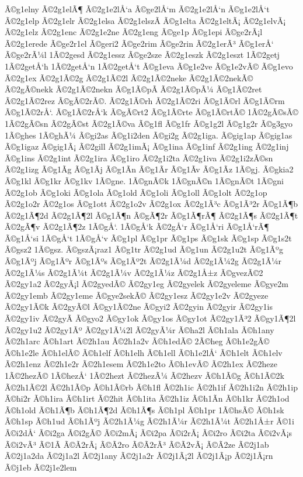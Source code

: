 {Ã©g1elny
Ã©2g1elÃ¶
Ã©2g1e2lÅ‘a
Ã©ge2lÅ‘m
Ã©2g1e2lÅ‘n
Ã©g1e2lÅ‘t
Ã©2g1elp
Ã©2g1elr
Ã©2g1elsa
Ã©2g1elszÃ­
Ã©g1elta
Ã©2g1eltÃ¡
Ã©2g1elvÃ¡
Ã©2g1elz
Ã©2g1enc
Ã©2g1e2ne
Ã©2g1eng
Ã©ge1p
Ã©g1epi
Ã©ge2rÃ¡l
Ã©2g1erede
Ã©ge2r1el
Ã©geri2
Ã©ge2rim
Ã©ge2rin
Ã©2g1erÃ³
Ã©g1erÅ‘
Ã©ge2rÃ¼l
1Ã©2gesd
Ã©2g1essz
Ã©ge2sze
Ã©2g1eszk
Ã©2g1eszt
1Ã©2getj
1Ã©2getÅ‘h
1Ã©2getÅ‘n
1Ã©2getÅ‘t
Ã©g1eva
Ã©g1e2ve
Ã©g1e2vÃ©
Ã©g1evo
Ã©2g1ex
Ã©2g1Ã©2g
Ã©2g1Ã©2l
Ã©2g1Ã©2neke
Ã©2g1Ã©2nekÃ©
Ã©2gÃ©nekk
Ã©2g1Ã©2nekn
Ã©g1Ã©pÃ­
Ã©2g1Ã©pÃ¼
Ã©g1Ã©2ret
Ã©2g1Ã©2rez
Ã©gÃ©2rÃ©.
Ã©2g1Ã©rh
Ã©2g1Ã©2ri
Ã©g1Ã©rl
Ã©g1Ã©rm
Ã©g1Ã©2rÅ‘.
Ã©g1Ã©2rÅ‘k
Ã©gÃ©rt2
Ã©g1Ã©rte
Ã©g1Ã©rtÃ©
1Ã©2gÃ©sÃ©
1Ã©2gÃ©sn
Ã©2gÃ©st
Ã©2g1Ã©va
Ã©g1fl
Ã©g1fr
Ã©g1g2l
Ã©g1g2r
Ã©g3gyo
1Ã©ghes
1Ã©ghÃ¼
Ã©gi2as
Ã©g1i2den
Ã©gi2g
Ã©2g1iga.
Ã©gig1ap
Ã©gig1as
Ã©g1igaz
Ã©gig1Ã¡
Ã©2gill
Ã©2g1imÃ¡
Ã©g1ina
Ã©g1inf
Ã©2g1ing
Ã©2g1inj
Ã©g1ins
Ã©2g1int
Ã©2g1ira
Ã©g1iro
Ã©2g1i2ta
Ã©2g1iva
Ã©2g1i2zÃ©sn
Ã©2g1izg
Ã©g1Ã­g
Ã©g1Ã­j
Ã©g1Ã­n
Ã©g1Ã­r
Ã©g1Ã­v
Ã©g1Ã­z
1Ã©gj.
Ã©gkia2
Ã©g1kl
Ã©g1kr
Ã©g1kv
1Ã©gne.
1Ã©gnÃ©k
1Ã©gnÃ©n
1Ã©gnÃ©t
1Ã©gni
Ã©2g1ob
Ã©g1oki
Ã©g1ola
Ã©g1old
Ã©g1oli
Ã©g1oll
Ã©g1olt
Ã©2g1op
Ã©2g1o2r
Ã©2g1os
Ã©g1ott
Ã©2g1o2v
Ã©2g1ox
Ã©2g1Ã³c
Ã©g1Ã³2r
Ã©g1Ã¶b
Ã©2g1Ã¶2d
Ã©2g1Ã¶2l
Ã©g1Ã¶n
Ã©gÃ¶2r
Ã©g1Ã¶rÃ¶
Ã©2g1Ã¶s
Ã©2g1Ã¶t
Ã©2gÃ¶v
Ã©2g1Ã¶2z
1Ã©gÅ‘.
1Ã©gÅ‘k
Ã©2gÅ‘r
Ã©g1Å‘ri
Ã©g1Å‘rÃ¶
Ã©g1Å‘si
1Ã©gÅ‘t
1Ã©gÅ‘v
Ã©g1pl
Ã©g1pr
Ã©g1ps
Ã©g1sk
Ã©g1sp
Ã©g1s2t
Ã©gsz2
1Ã©gsz.
Ã©gszÃ¡raz1
Ã©g1tr
Ã©2g1ud
Ã©g1un
Ã©2g1u2t
Ã©g1Ãºg
Ã©g1Ãºj
Ã©g1Ãºr
Ã©g1Ãºs
Ã©g1Ãº2t
Ã©2g1Ã¼d
Ã©2g1Ã¼2g
Ã©2g1Ã¼r
Ã©2g1Ã¼s
Ã©2g1Ã¼t
Ã©2g1Ã¼v
Ã©2g1Ã¼z
Ã©2g1Å±z
Ã©gvezÃ©2
Ã©2gy1a2
Ã©2gyÃ¡l
Ã©2gyedÃ©
Ã©2gy1eg
Ã©2gyelek
Ã©2gyeleme
Ã©gye2m
Ã©2gy1emb
Ã©2gy1eme
Ã©gye2sekÃ©
Ã©2gy1esz
Ã©2gy1e2v
Ã©2gyeze
Ã©2gy1Ã©k
Ã©2gyÃ©l
Ã©gy1Ã©2ne
Ã©gyi2
Ã©2gyin
Ã©2gyir
Ã©2gy1is
Ã©2gy1iv
Ã©2gyÃ­
Ã©gyo2
Ã©gy1ok
Ã©gy1os
Ã©gy1ot
Ã©2gy1Ã³2
Ã©gy1Ã¶2l
Ã©2gy1u2
Ã©2gy1Ãº
Ã©2gy1Ã¼2l
Ã©2gyÃ¼r
Ã©ha2l
Ã©h1ala
Ã©h1any
Ã©2h1arc
Ã©h1art
Ã©2h1au
Ã©2h1a2v
Ã©h1edÃ©
2Ã©heg
Ã©h1e2gÃ©
Ã©h1e2le
Ã©h1elÃ©
Ã©h1elf
Ã©h1elh
Ã©h1ell
Ã©h1e2lÅ‘
Ã©h1elt
Ã©h1elv
Ã©2h1enz
Ã©2h1e2r
Ã©2h1esem
Ã©2h1e2to
Ã©h1evÃ©
Ã©2h1ex
Ã©2heze
1Ã©2hezÃ©
1Ã©hezÅ‘
1Ã©2hezt
Ã©2hezÃ¼
Ã©2hezv
Ã©h1Ã©g
Ã©h1Ã©2k
Ã©2h1Ã©2l
Ã©2h1Ã©p
Ã©h1Ã©rb
Ã©h1fl
Ã©2h1ic
Ã©2h1if
Ã©2h1i2n
Ã©2h1ip
Ã©hi2r
Ã©h1ira
Ã©h1irt
Ã©2hit
Ã©h1ita
Ã©2h1iz
Ã©h1Ã­n
Ã©h1kr
Ã©2h1od
Ã©h1old
Ã©h1Ã¶b
Ã©h1Ã¶2d
Ã©h1Ã¶s
Ã©h1pl
Ã©h1pr
1Ã©hsÃ©
Ã©h1sk
Ã©h1sp
Ã©h1ud
Ã©h1Ãºj
Ã©2h1Ã¼g
Ã©2h1Ã¼r
Ã©2h1Ã¼t
Ã©2h1Å±r
Ã©1i
Ã©i2dÅ‘
Ã©i2ga
Ã©i2gÃ©
Ã©i2mÃ¡
Ã©i2pa
Ã©i2rÃ¡
Ã©i2ro
Ã©i2ta
Ã©i2vÃ¡s
Ã©i2vÃ³
Ã©1Ã­
Ã©Ã­2rÃ¡
Ã©Ã­2ro
Ã©Ã­2rÃ³
Ã©Ã­2vÃ¡
Ã©Ã­2ze
Ã©2j1ab
Ã©2j1a2da
Ã©2j1a2l
Ã©2j1any
Ã©2j1a2r
Ã©2j1Ã¡2l
Ã©2j1Ã¡p
Ã©2j1Ã¡rn
Ã©j1eb
Ã©2j1e2lem
}
